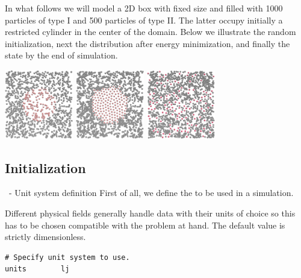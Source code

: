 \begin{frame}[fragile]{\secname}{\subsecname}
In what follows we will model a 2D box with fixed size and filled with 1000 particles of type {I} and 500 particles of type {II}. The latter occupy initially a restricted cylinder in the center of the domain. Below we illustrate the random initialization, next the distribution after energy minimization, and finally the state by the end of simulation.

\vspace{0.5cm}

{%
\hfill%
\includegraphics[width=3cm]{media/000-lennard-jones-init-random.png}
\hfill%
\includegraphics[width=3cm]{media/001-lennard-jones-init-minimized.png}
\hfill%
\includegraphics[width=3cm]{media/002-lennard-jones-final-state.png}
\hfill%
}
\end{frame}

\subsection{Initialization}

\begin{frame}[fragile]{\secname}{\subsecname\ - Unit system definition}
First of all, we define the  to be used in a simulation.

\vspace{0.5cm}

Different physical fields generally handle data with their units of choice so this has to be chosen compatible with the problem at hand. The default value  is strictly dimensionless.

\vspace{0.5cm}

\begin{lstlisting}[language=LAMMPS,basicstyle=\small]
# Specify unit system to use.
units        lj
\end{lstlisting}
\end{frame}

